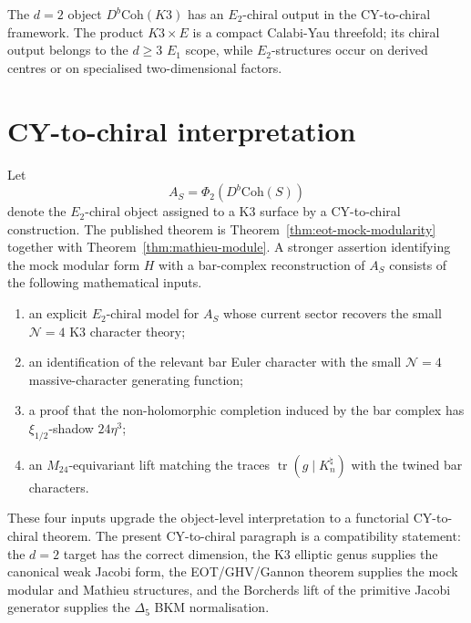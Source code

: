 \documentclass[11pt]{article}
\newcommand{\Phimap}{\Phi}
\newcommand{\Coh}{\mathrm{Coh}}
\newcommand{\Db}{D^b}
\begin{document}
The $d=2$ object $\Db\Coh(K3)$ has an $E_2$-chiral output in the
CY-to-chiral framework. The product $K3\times E$ is a compact
Calabi-Yau threefold; its chiral output belongs to the $d\geq 3$
$E_1$ scope, while $E_2$-structures occur on derived centres or on
specialised two-dimensional factors.

\section{CY-to-chiral interpretation}
\label{sec:cy-to-chiral}

Let
\[
  A_S=\Phimap_2(\Db\Coh(S))
\]
denote the $E_2$-chiral object assigned to a K3 surface by a
CY-to-chiral construction. The published theorem is
Theorem~\ref{thm:eot-mock-modularity} together with
Theorem~\ref{thm:mathieu-module}. A stronger assertion identifying
the mock modular form $H$ with a bar-complex reconstruction of
$A_S$ consists of the following mathematical inputs.

\begin{enumerate}[label=\textup{(\roman*)}]
\item an explicit $E_2$-chiral model for $A_S$ whose current sector
recovers the small $\mathcal N=4$ K3 character theory;
\item an identification of the relevant bar Euler character with the
small $\mathcal N=4$ massive-character generating function;
\item a proof that the non-holomorphic completion induced by the bar
complex has $\xi_{1/2}$-shadow $24\eta^3$;
\item an $M_{24}$-equivariant lift matching the traces
$\operatorname{tr}(g\mid K_n^\natural)$ with the twined bar characters.
\end{enumerate}

These four inputs upgrade the object-level interpretation to a
functorial CY-to-chiral theorem. The present CY-to-chiral paragraph is
a compatibility statement: the $d=2$ target has the
correct dimension, the K3 elliptic genus supplies the canonical
weak Jacobi form, the EOT/GHV/Gannon theorem supplies the mock
modular and Mathieu structures, and the Borcherds lift of the
primitive Jacobi generator supplies the $\Delta_5$ BKM normalisation.
\end{document}
